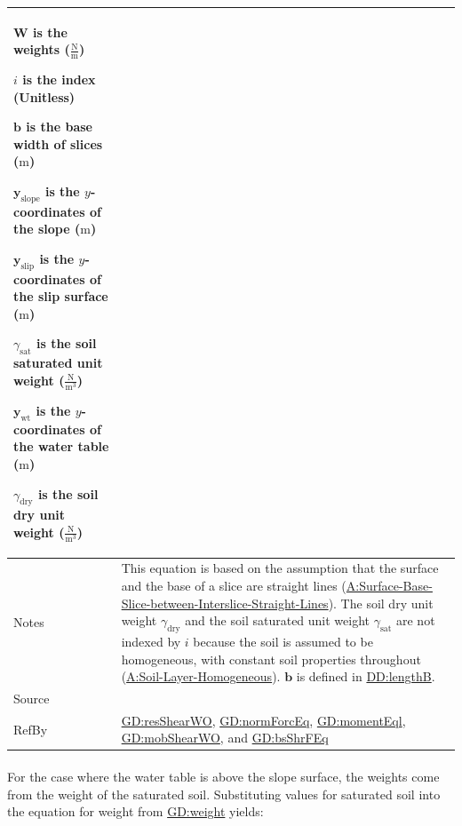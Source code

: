 \documentclass[12pt]{article}
\begin{document}
\begin{minipage}{\textwidth}
\begin{tabular}{>{\raggedright}p{}>{\raggedright\arraybackslash}p{}}
\begin{symbDescription}
              \item{$\symbf{W}$ is the weights ($\frac{\text{N}}{\text{m}}$)}
              \item{$i$ is the index (Unitless)}
              \item{$\symbf{b}$ is the base width of slices (${\text{m}}$)}
              \item{${\symbf{y}_{\text{slope}}}$ is the $y$-coordinates of the slope (${\text{m}}$)}
              \item{${\symbf{y}_{\text{slip}}}$ is the $y$-coordinates of the slip surface (${\text{m}}$)}
              \item{${γ_{\text{sat}}}$ is the soil saturated unit weight ($\frac{\text{N}}{\text{m}^{3}}$)}
              \item{${\symbf{y}_{\text{wt}}}$ is the $y$-coordinates of the water table (${\text{m}}$)}
              \item{${γ_{\text{dry}}}$ is the soil dry unit weight ($\frac{\text{N}}{\text{m}^{3}}$)}
              \end{symbDescription}
\\ \midrule
Notes & This equation is based on the assumption that the surface and the base of a slice are straight lines (\hyperref[assumpSBSBISL]{A:Surface-Base-Slice-between-Interslice-Straight-Lines}). The soil dry unit weight ${γ_{\text{dry}}}$ and the soil saturated unit weight ${γ_{\text{sat}}}$ are not indexed by $i$ because the soil is assumed to be homogeneous, with constant soil properties throughout (\hyperref[assumpSLH]{A:Soil-Layer-Homogeneous}). $\symbf{b}$ is defined in \hyperref[DD:lengthB]{DD:lengthB}.
        
\\ \midrule
Source & \cite{fredlund1977}
         
\\ \midrule
RefBy & \hyperref[GD:resShearWO]{GD:resShearWO}, \hyperref[GD:normForcEq]{GD:normForcEq}, \hyperref[GD:momentEql]{GD:momentEql}, \hyperref[GD:mobShearWO]{GD:mobShearWO}, and \hyperref[GD:bsShrFEq]{GD:bsShrFEq}
        
\\ \bottomrule
\end{tabular}
\end{minipage}

\paragraph{}
\label{GD:sliceWghtDeriv}
For the case where the water table is above the slope surface, the weights come from the weight of the saturated soil. Substituting values for saturated soil into the equation for weight from \hyperref[GD:weight]{GD:weight} yields:
\end{document}
